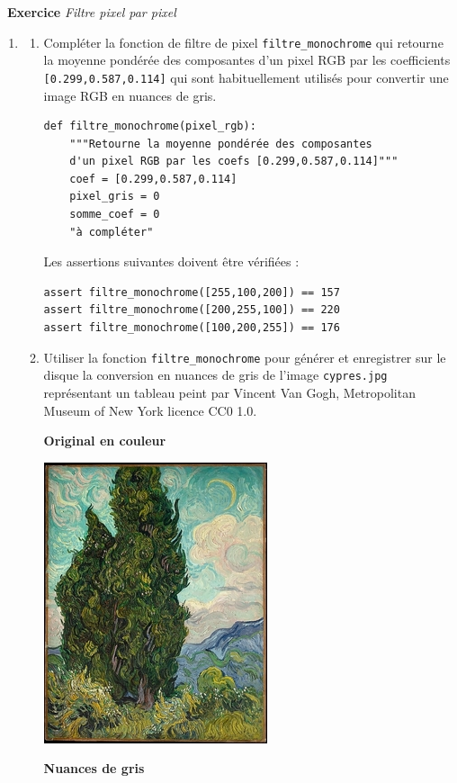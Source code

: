 \documentclass[a4paper, french, 12pt]{article}
\newcounter{exo}
\newenvironment{exercice}[1]
{\par \medskip   \addtocounter{exo}{1} \noindent  
\begin{bclogo}[arrondi =0.1,   noborder = true, logo=\bccrayon, marge=4]{~\textbf{Exercice} \textbf{\theexo} {\itshape #1} }  \par}
{
\end{bclogo}
 \par \bigskip }
\newcounter{def}
\begin{document}
\begin{exercice}{Filtre pixel par pixel}
\begin{enumerate}
\begin{enumerate}
\end{enumerate}

\item 

\begin{enumerate}
	\item Compléter la fonction  de filtre de pixel \texttt{filtre\_monochrome} qui retourne la moyenne pondérée des composantes d'un pixel RGB par les coefficients \texttt{[0.299,0.587,0.114]} qui sont habituellement utilisés pour convertir une image RGB en nuances de gris.
	
\begin{lstlisting}[style=rond]
def filtre_monochrome(pixel_rgb):
    """Retourne la moyenne pondérée des composantes
    d'un pixel RGB par les coefs [0.299,0.587,0.114]"""
    coef = [0.299,0.587,0.114]
    pixel_gris = 0
    somme_coef = 0
    "à compléter"
\end{lstlisting}

Les assertions suivantes doivent être vérifiées :

\begin{lstlisting}[style=rond]
assert filtre_monochrome([255,100,200]) == 157
assert filtre_monochrome([200,255,100]) == 220
assert filtre_monochrome([100,200,255]) == 176
\end{lstlisting}

\item Utiliser la fonction \texttt{filtre\_monochrome} pour générer et enregistrer sur le disque la conversion en nuances de gris de l'image \texttt{cypres.jpg} représentant un  tableau peint par Vincent Van Gogh,  {\footnotesize Metropolitan Museum of New York licence CC0 1.0}.

\begin{minipage}{0.45\linewidth}
\begin{center}
\textbf{Original en couleur}
 
\includegraphics[scale=1]{images/cypres-tiny.jpg}
\end{center}
\end{minipage}\hfill
\begin{minipage}{0.45\linewidth}
\begin{center}
\textbf{Nuances  de gris}


\end{center}
\end{minipage}
\end{enumerate}
\end{enumerate}
\end{exercice}
\end{document}
